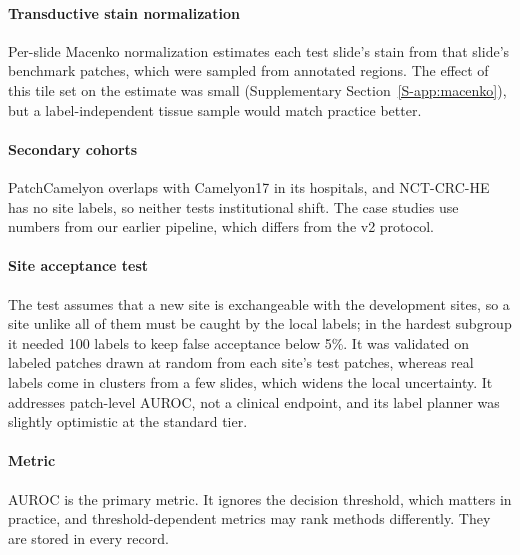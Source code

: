 \paragraph{Transductive stain normalization} Per-slide Macenko normalization
estimates each test slide's stain from that slide's benchmark patches, which
were sampled from annotated regions. The effect of this tile set on the
estimate was small (Supplementary Section~\ref{S-app:macenko}), but a label-independent tissue
sample would match practice better.

\paragraph{Secondary cohorts} PatchCamelyon overlaps with Camelyon17 in its
hospitals, and NCT-CRC-HE has no site labels, so neither tests institutional
shift. The case studies use numbers from our earlier pipeline, which differs
from the v2 protocol.

\paragraph{Site acceptance test} The test assumes that a new site is
exchangeable with the development sites, so a site unlike all of them must be
caught by the local labels; in the hardest subgroup it needed 100 labels to
keep false acceptance below 5\%. It was validated on labeled patches drawn at
random from each site's test patches, whereas real labels come in clusters from
a few slides, which widens the local uncertainty. It addresses patch-level
AUROC, not a clinical endpoint, and its label planner was slightly optimistic
at the standard tier.

\paragraph{Metric} AUROC is the primary metric. It ignores the decision
threshold, which matters in practice, and threshold-dependent metrics may
rank methods differently. They are stored in every record.
